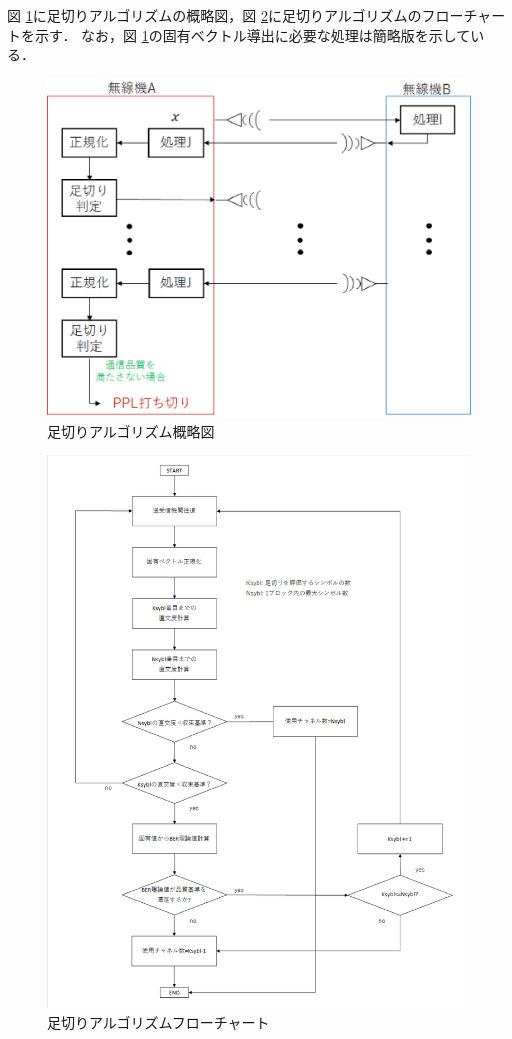 図 \ref{figCutoff}に足切りアルゴリズムの概略図，図 \ref{figCutoffFlow}に足切りアルゴリズムのフローチャートを示す．
なお，図 \ref{figCutoff}の固有ベクトル導出に必要な処理は簡略版を示している．
\begin{figure}
    \centering
    \includegraphics[width=\linewidth]{chapter4/figure/Cutoff.eps}
    \caption{足切りアルゴリズム概略図}
    \label{figCutoff}
\end{figure}
\begin{figure}
    \centering
    \includegraphics[width=0.95\linewidth]{chapter4/figure/CutoffFlow.eps}
    \caption{足切りアルゴリズムフローチャート}
    \label{figCutoffFlow}
\end{figure}
